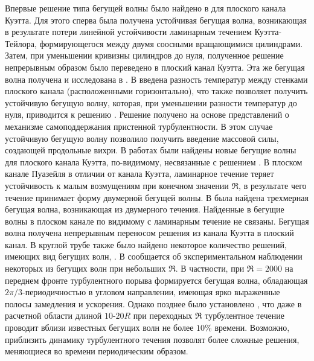 Впервые решение типа бегущей волны было найдено в \cite{Nagata1990} для плоского канала Куэтта. Для этого сперва была получена устойчивая бегущая волна, возникающая в результате потери линейной устойчивости ламинарным течением Куэтта-Тейлора, формирующегося между двумя соосными вращающимися цилиндрами. Затем, при уменьшении кривизны цилиндров до нуля, полученное решение непрерывным образом было переведено в плоский канал Куэтта. Эта же бегущая волна получена и исследована в \cite{Clever1992, Waleffe1998, Waleffe2003}. В \cite{Clever1992} введена разность температур между стенками плоского канала (расположенными горизонтально), что также позволяет получить устойчивую бегущую волну, которая, при уменьшении разности температур до нуля, приводится к решению \cite{Nagata1990}. Решение \cite{Waleffe1998, Waleffe2003} получено на основе представлений о механизме самоподдержания пристенной турбулентности. В этом случае устойчивую бегущую волну позволило получить введение массовой силы, создающей продольные вихри. В работах \cite{Gibson2008, Gibson2009, Itano2009, Nagata1997, Schmiegel1999} были найдены новые бегущие волны для плоского канала Куэтта, по-видимому, несвязанные с решением \cite{Nagata1990}. В плоском канале Пуазейля в отличии от канала Куэтта, ламинарное течение теряет устойчивость к малым возмущениям при конечном значении $\Re$, в результате чего течение принимает форму двумерной бегущей волны. В \cite{Ehrenstein1991} была найдена трехмерная бегущая волна, возникающая из двумерного течения. Найденные в \cite{Waleffe1998, Waleffe2001, Waleffe2003, Itano2001} бегущие волны в плоском канале по видимому с ламинарным течение не связаны. Бегущая волна \cite{Waleffe1998, Waleffe2001, Waleffe2003} получена непрерывным переносом решения \cite{Nagata1990} из канала Куэтта в плоский канал. В круглой трубе также было найдено некоторое количество решений, имеющих вид бегущих волн, \cite{Faisst2003, Wedin2004, Pringle2007, Pringle2009, Altmeyer2015}. В \cite{Hof2004} сообщается об экспериментальном наблюдении некоторых из бегущих волн \cite{Faisst2003, Wedin2004} при небольших $\Re$. В частности, при $\Re = 2000$ на переднем фронте турбулентного порыва формируется бегущая волна, обладающая $2\pi/3$-периодичностью в угловом направлении, имеющая ярко выраженные полосы замедления и ускорения. Однако позднее было установлено \cite{Kerswell2007}, что даже в расчетной области длиной $10$-$20R$ при переходных $\Re$ турбулентное течение проводит вблизи известных бегущих волн не более $10\%$ времени. Возможно, приблизить динамику турбулентного течения позволят более сложные решения, меняющиеся во времени периодическим образом.

